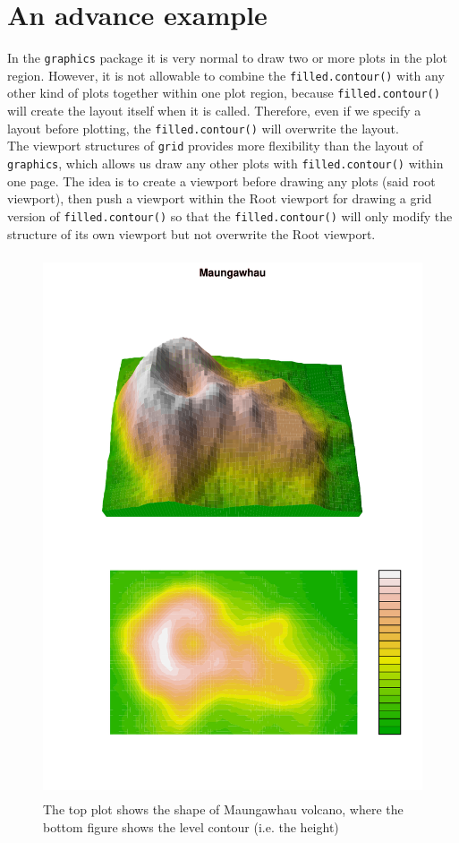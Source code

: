 \documentclass[paper=a4, fontsize=11pt]{report}
\begin{document}
\newpage
\section{An advance example}
In the \texttt{graphics} package it is very normal to draw two or more plots in the plot region. However, it is not allowable to combine the \texttt{filled.contour()} with any other kind of plots together within one plot region, because \texttt{filled.contour()} will create the layout itself when it is called. Therefore, even if we specify a layout before plotting, the \texttt{filled.contour()} will overwrite the layout.\\

The viewport structures of \texttt{grid} provides more flexibility than the layout of \texttt{graphics}, which allows us draw any other plots with \texttt{filled.contour()} within one page. The idea is to create a viewport before drawing any plots (said root viewport), then push a viewport within the Root viewport for drawing a grid version of \texttt{filled.contour()} so that the \texttt{filled.contour()} will only modify the structure of its own viewport but not overwrite the Root viewport.\\
\begin{figure}[H]
\begin{center}
  \includegraphics[height = 16cm, width = 12cm]{figure/Chapter6_example_3_1.pdf}
  \caption{The top plot shows the shape of Maungawhau volcano, where the bottom figure shows the level contour (i.e. the height)}
  	\label{Example_6.2.1}
\end{center}
\end{figure}
\end{document}
